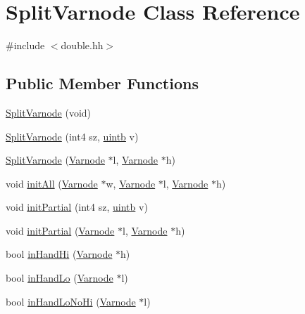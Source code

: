 \hypertarget{class_split_varnode}{}\section{Split\+Varnode Class Reference}
\label{class_split_varnode}


{\ttfamily \#include $<$double.\+hh$>$}

\subsection*{Public Member Functions}
\begin{DoxyCompactItemize}
\item 
\mbox{\hyperlink{class_split_varnode_ae29b33d88c26f56baafd37cf1bad356c}{Split\+Varnode}} (void)
\item 
\mbox{\hyperlink{class_split_varnode_a1361d18e678130ec7e2c0fffc3e3fa49}{Split\+Varnode}} (int4 sz, \mbox{\hyperlink{types_8h_a2db313c5d32a12b01d26ac9b3bca178f}{uintb}} v)
\item 
\mbox{\hyperlink{class_split_varnode_a9a0d2cdc707d94e0fca72a2066593916}{Split\+Varnode}} (\mbox{\hyperlink{class_varnode}{Varnode}} $\ast$l, \mbox{\hyperlink{class_varnode}{Varnode}} $\ast$h)
\item 
void \mbox{\hyperlink{class_split_varnode_a9acc5b01b242ad7d852ec86a1af62b51}{init\+All}} (\mbox{\hyperlink{class_varnode}{Varnode}} $\ast$w, \mbox{\hyperlink{class_varnode}{Varnode}} $\ast$l, \mbox{\hyperlink{class_varnode}{Varnode}} $\ast$h)
\item 
void \mbox{\hyperlink{class_split_varnode_a858758ae5cd0507de5f06fc966e10156}{init\+Partial}} (int4 sz, \mbox{\hyperlink{types_8h_a2db313c5d32a12b01d26ac9b3bca178f}{uintb}} v)
\item 
void \mbox{\hyperlink{class_split_varnode_a72c28276a2cb5c479131f80367917f4c}{init\+Partial}} (\mbox{\hyperlink{class_varnode}{Varnode}} $\ast$l, \mbox{\hyperlink{class_varnode}{Varnode}} $\ast$h)
\item 
bool \mbox{\hyperlink{class_split_varnode_aeabc6a2a9163112cf04c79aa2dfe31f8}{in\+Hand\+Hi}} (\mbox{\hyperlink{class_varnode}{Varnode}} $\ast$h)
\item 
bool \mbox{\hyperlink{class_split_varnode_a7be3658bd83eb37b531a5df3c2e0eb2c}{in\+Hand\+Lo}} (\mbox{\hyperlink{class_varnode}{Varnode}} $\ast$l)
\item 
bool \mbox{\hyperlink{class_split_varnode_a45771bce187576ac97d128c80c364f39}{in\+Hand\+Lo\+No\+Hi}} (\mbox{\hyperlink{class_varnode}{Varnode}} $\ast$l)

\end{DoxyCompactItemize}
